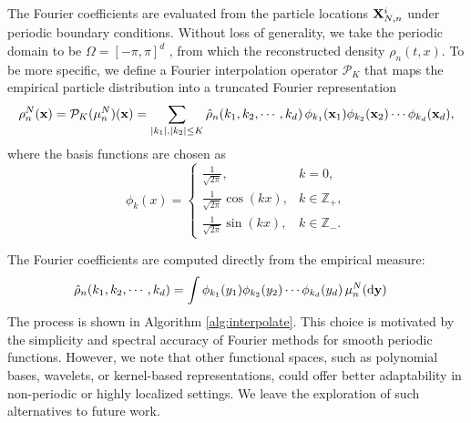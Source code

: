 \documentclass[a4paper,fleqn]{cas-sc}
\theoremstyle{definition}
\theoremstyle{remark}
\begin{document}
The Fourier coefficients are evaluated from the particle locations $\mathbf{X}_{N,n}^i$ under periodic boundary conditions. Without loss of generality, we take the periodic domain to be $\Omega=[-\pi,\pi]^d$ , from which the reconstructed density $\rho_n(t,x)$. To be more specific, we define a Fourier interpolation operator $\mathcal P_K$
that maps the empirical particle distribution into a truncated Fourier representation 
\[
\rho^N_n(\mathbf{x}) = \mathcal{P}_K(\mu^N_n)(\mathbf{x}) 
          = \sum_{\vert k_1\vert ,\vert k_2\vert \leq K} \hat{\rho}_n(k_1,k_2,\cdots,k_d)\,\phi_{k_1}(\mathbf{x}_1)\phi_{k_2}(\mathbf{x}_2)\cdots\phi_{k_d}(\mathbf{x}_d),
\]
where the basis functions are chosen as
\[
\phi_k(x) =
\begin{cases}
\frac{1}{\sqrt{2\pi}}, & k=0, \\
\frac{1}{\sqrt{2\pi}} \cos(k  x), & k \in \mathbb{Z}_+, \\
\frac{1}{\sqrt{2\pi}}\sin(k  x), & k \in \mathbb{Z}_- .
\end{cases}
\]

The Fourier coefficients are computed directly from the empirical measure:
\begin{equation}
\begin{aligned}
    \hat{\rho}_n(k_1,k_2,\cdots,k_d) &= \int \phi_{k_1}(y_1)\phi_{k_2}(y_2)\cdots \phi_{k_d}(y_d)\,\mu^N_n(\mathrm{d}\mathbf{y})
\end{aligned}
\label{eq:Fourier_mode}
\end{equation}
The process is shown in Algorithm \ref{alg:interpolate}. 
This choice is motivated by the simplicity and spectral accuracy of Fourier methods for smooth periodic functions. However, we note that other functional spaces, such as polynomial bases, wavelets, or kernel-based representations, could offer better adaptability in non-periodic or highly localized settings. We leave the exploration of such alternatives to future work.
\end{document}
